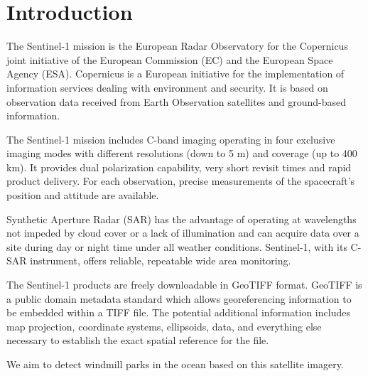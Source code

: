\section{Introduction}
%

The Sentinel-1 mission is the European Radar Observatory for the Copernicus joint initiative of the European Commission (EC) and the European Space Agency (ESA). Copernicus is a European initiative for the implementation of information services dealing with environment and security. It is based on observation data received from Earth Observation satellites and ground-based information.

The Sentinel-1 mission includes C-band imaging operating in four exclusive imaging modes with different resolutions (down to 5 m) and coverage (up to 400 km). It provides dual polarization capability, very short revisit times and rapid product delivery. For each observation, precise measurements of the spacecraft's position and attitude are available.

Synthetic Aperture Radar (SAR) has the advantage of operating at wavelengths not impeded by cloud cover or a lack of illumination and can acquire data over a site during day or night time under all weather conditions. Sentinel-1, with its C-SAR instrument, offers reliable, repeatable wide area monitoring.

The Sentinel-1 products are freely downloadable in GeoTIFF format.  GeoTIFF is a public domain metadata standard which allows georeferencing information to be embedded within a TIFF file. The potential additional information includes map projection, coordinate systems, ellipsoids, data, and everything else necessary to establish the exact spatial reference for the file.

We aim to detect windmill parks in the ocean based on this satellite imagery.